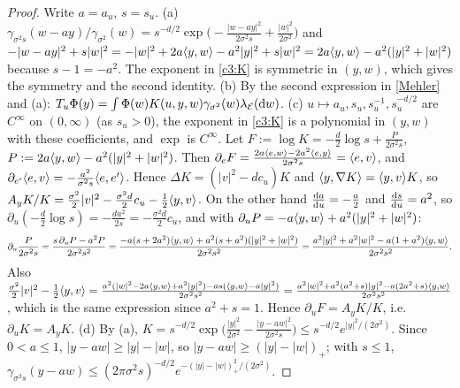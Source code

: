 \begin{proof}
Write $a=a_u$, $s=s_u$. (a) $\gamma_{\sigma^2s}(w-ay)/\gamma_{\sigma^2}(w)=s^{-d/2}\exp\big(-\frac{|w-ay|^2}{2\sigma^2s}+\frac{|w|^2}{2\sigma^2}\big)$ and
$-|w-ay|^2+s|w|^2=-|w|^2+2a\langle y,w\rangle-a^2|y|^2+s|w|^2=2a\langle y,w\rangle-a^2(|y|^2+|w|^2)$ because $s-1=-a^2$. The exponent in \eqref{c3:K} is symmetric in $(y,w)$, which gives the symmetry and the second identity.
(b) By the second expression in \eqref{Mehler} and (a): $T_u\Phi(y)=\int\Phi(w)K(u,y,w)\gamma_{\sigma^2}(w)\lambda_{\mathcal E}(\mathrm{d} w)$.
(c) $u\mapsto a_u,s_u,s_u^{-1},s_u^{-d/2}$ are $C^\infty$ on $(0,\infty)$ (as $s_u>0$), the exponent in \eqref{c3:K} is a polynomial in $(y,w)$ with these coefficients, and $\exp$ is $C^\infty$. Let $F:=\log K=-\frac d2\log s+\frac{P}{2\sigma^2s}$, $P:=2a\langle y,w\rangle-a^2(|y|^2+|w|^2)$.
Then $\partial_eF=\frac{2a\langle e,w\rangle-2a^2\langle e,y\rangle}{2\sigma^2s}=\langle e,v\rangle$, and $\partial_{e'}\langle e,v\rangle=-\frac{a^2}{\sigma^2s}\langle e,e'\rangle$. Hence $\Delta K=(|v|^2-dc_u)K$ and $\langle y,\nabla K\rangle=\langle y,v\rangle K$, so
$A_yK/K=\frac{\sigma^2}2|v|^2-\frac{\sigma^2d}{2}c_u-\frac12\langle y,v\rangle$.
On the other hand $\frac{\mathrm{d} a}{\mathrm{d} u}=-\frac a2$ and $\frac{\mathrm{d} s}{\mathrm{d} u}=a^2$, so $\partial_u(-\frac d2\log s)=-\frac{da^2}{2s}=-\frac{\sigma^2d}{2}c_u$, and with $\partial_uP=-a\langle y,w\rangle+a^2(|y|^2+|w|^2)$:
\[
\partial_u\frac{P}{2\sigma^2s}=\frac{s\,\partial_uP-a^2P}{2\sigma^2s^2}=\frac{-a(s+2a^2)\langle y,w\rangle+a^2(s+a^2)(|y|^2+|w|^2)}{2\sigma^2s^2}=\frac{a^2|y|^2+a^2|w|^2-a(1+a^2)\langle y,w\rangle}{2\sigma^2s^2}.
\]
Also $\frac{\sigma^2}2|v|^2-\frac12\langle y,v\rangle=\frac{a^2(|w|^2-2a\langle y,w\rangle+a^2|y|^2)-as(\langle y,w\rangle-a|y|^2)}{2\sigma^2s^2}=\frac{a^2|w|^2+a^2(a^2+s)|y|^2-a(2a^2+s)\langle y,w\rangle}{2\sigma^2s^2}$, which is the same expression since $a^2+s=1$.
Hence $\partial_uF=A_yK/K$, i.e.\ $\partial_uK=A_yK$.
(d) By (a), $K=s^{-d/2}\exp\big(\frac{|y|^2}{2\sigma^2}-\frac{|y-aw|^2}{2\sigma^2s}\big)\le s^{-d/2}e^{|y|^2/(2\sigma^2)}$. Since $0<a\le1$, $|y-aw|\ge|y|-|w|$, so $|y-aw|\ge(|y|-|w|)_+$; with $s\le1$, $\gamma_{\sigma^2s}(y-aw)\le(2\pi\sigma^2s)^{-d/2}e^{-(|y|-|w|)_+^2/(2\sigma^2)}$.
\end{proof}

